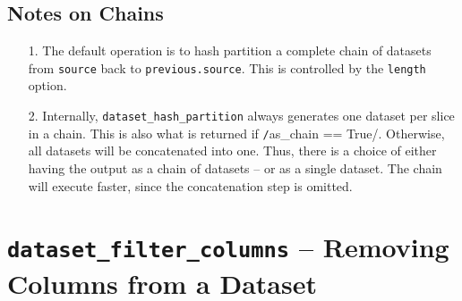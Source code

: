 \subsection{Notes on Chains}
\begin{enumerate}
  \item[1.]  The default operation is to hash partition a complete
    chain of datasets from \texttt{source} back to
    \texttt{previous.source}.  This is controlled by the
    \texttt{length} option.

  \item[2.]  Internally, \texttt{dataset\_hash\_partition} always
    generates one dataset per slice in a chain.  This is also what is
    returned if \texttt/as_chain == True/.  Otherwise, all
    datasets will be concatenated into one.  Thus, there is a choice
    of either having the output as a chain of datasets -- or as a
    single dataset.  The chain will execute faster, since the
    concatenation step is omitted.
\end{enumerate}








\clearpage
\section{\texttt{dataset\_filter\_columns} -- Removing Columns from a Dataset}

